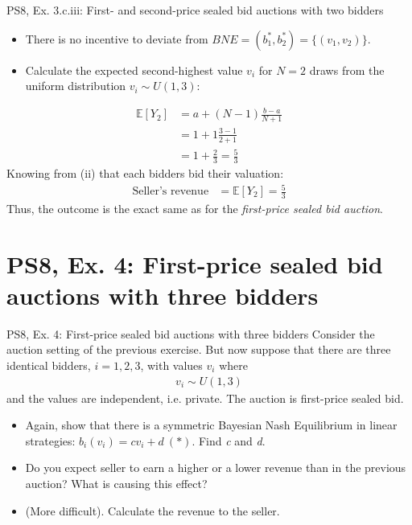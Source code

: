 \begin{frame}{PS8, Ex. 3.c.iii: First- and second-price sealed bid auctions with two bidders}
\begin{multicols}{2}
      \vspace{-20pt}
      \begin{itemize}
        \item[(ii)] There is no incentive to deviate from $BNE=(b_1^*,b_2^*)=\{(v_1,v_2)\}$.
        \item[(iii)] Calculate the expected second-highest value $v_i$ for $N=2$ draws from the uniform distribution $v_i\sim U(1,3)$:
      \end{itemize}
      \vspace{-18pt}
      \begin{align*}
        \mathbb{E}[Y_2]&=a+(N-1)\frac{b-a}{N+1}\\
                       &=1+1\frac{3-1}{2+1}\\
                       &=1+\frac{2}{3}=\frac{5}{3}
      \end{align*}
      Knowing from (ii) that each bidders bid their valuation:
      \vspace{-8pt}
      \begin{align*}
        \text{Seller's revenue}&=\mathbb{E}[Y_2]=\frac{5}{3}
      \end{align*}
      Thus, the outcome is the exact same as for the \textit{first-price sealed bid auction}.
      \vfill\null
    \end{multicols}
\end{frame}



\section{PS8, Ex. 4: First-price sealed bid auctions with three bidders}

\begin{frame}{PS8, Ex. 4: First-price sealed bid auctions with three bidders}
    Consider the auction setting of the previous exercise. But now suppose that there are three identical bidders, $i = 1, 2, 3$, with values $v_i$ where
    \begin{align*}
      v_i\sim U(1, 3)
    \end{align*}
    and the values are independent, i.e. private. The auction is first-price sealed bid.
    \begin{itemize}
      \item[(a)] Again, show that there is a symmetric Bayesian Nash Equilibrium in linear strategies: $b_i(v_i) = cv_i + d\ (*)$. Find \textit{c} and \textit{d}.
      \item[(b)] Do you expect seller to earn a higher or a lower revenue than in the previous auction? What is causing this effect?
      \item[(c)] (More difficult). Calculate the revenue to the seller.
    \end{itemize}
    \vfill\null
\end{frame}


